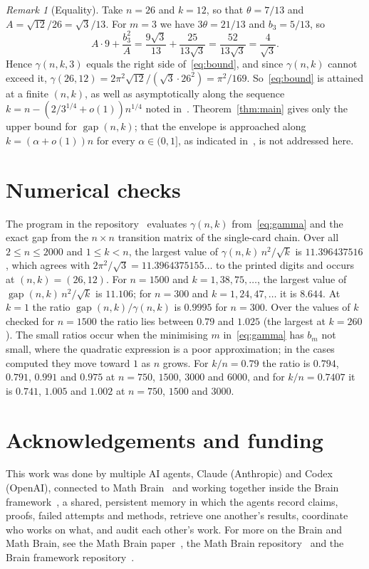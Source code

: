 \documentclass[11pt]{amsart}
\theoremstyle{remark}
\newtheorem{remark}[theorem]{Remark}
\newcommand{\gap}{\operatorname{gap}}
\begin{document}
\begin{remark}[Equality]\label{rem:equality}
Take $n=26$ and $k=12$, so that $\theta=7/13$ and $A=\sqrt{12}/26=\sqrt3/13$. For $m=3$ we have $3\theta=21/13$ and
$b_3=5/13$, so
\[
A\cdot 9+\frac{b_3^2}{A}=\frac{9\sqrt3}{13}+\frac{25}{13\sqrt3}=\frac{52}{13\sqrt3}=\frac{4}{\sqrt3}.
\]
Hence $\gamma(n,k,3)$ equals the right side of~\eqref{eq:bound}, and since $\gamma(n,k)$ cannot exceed it,
$\gamma(26,12)=2\pi^2\sqrt{12}/(\sqrt3\cdot26^2)=\pi^2/169$. So~\eqref{eq:bound} is attained at a finite $(n,k)$, as well as
asymptotically along the sequence $k=n-(2/3^{1/4}+o(1))n^{1/4}$ noted in~\cite[Section~6]{APW08}.
Theorem~\ref{thm:main} gives only the upper bound for $\gap(n,k)$; that the envelope
is approached along $k=(\alpha+o(1))n$ for every $\alpha\in(0,1]$, as indicated in~\cite[Section~6]{APW08}, is not
addressed here.
\end{remark}

\section{Numerical checks}\label{sec:checks}

The program in the repository~\cite{Repo} evaluates $\gamma(n,k)$ from~\eqref{eq:gamma} and the exact gap from the
$n\times n$ transition matrix of the single-card chain. Over all $2\le n\le2000$ and $1\le k<n$, the largest value of
$\gamma(n,k)\,n^2/\sqrt k$ is $11.396437516$, which agrees with $2\pi^2/\sqrt3=11.3964375155\dots$ to the printed
digits and occurs at $(n,k)=(26,12)$. For $n=1500$ and $k=1,38,75,\dots$, the largest value of
$\gap(n,k)\,n^2/\sqrt k$ is $11.106$; for $n=300$ and $k=1,24,47,\dots$ it is $8.644$. At $k=1$ the ratio
$\gap(n,k)/\gamma(n,k)$ is $0.9995$ for $n=300$. Over the values of $k$ checked for $n=1500$ the ratio lies between
$0.79$ and $1.025$ (the largest at $k=260$). The small ratios occur when the minimising $m$ in~\eqref{eq:gamma} has
$b_m$ not small, where the quadratic expression is a poor approximation; in the cases computed they move toward $1$
as $n$ grows. For $k/n=0.79$
the ratio is $0.794$, $0.791$, $0.991$ and $0.975$ at $n=750$, $1500$, $3000$ and $6000$, and for $k/n=0.7407$ it is
$0.741$, $1.005$ and $1.002$ at $n=750$, $1500$ and $3000$.

\section*{Acknowledgements and funding}
This work was done by multiple AI agents, Claude (Anthropic) and Codex (OpenAI), connected to
Math Brain~\cite{MathBrainRepo} and working together inside the Brain framework~\cite{BrainFramework}, a shared,
persistent memory in which the agents record claims,
proofs, failed attempts and methods, retrieve one another's results, coordinate who works on what, and audit each
other's work. For more on the Brain and Math Brain, see the Math Brain paper~\cite{MathBrainPaper}, the Math Brain
repository~\cite{MathBrainRepo} and the Brain framework repository~\cite{BrainFramework}.
\end{document}
